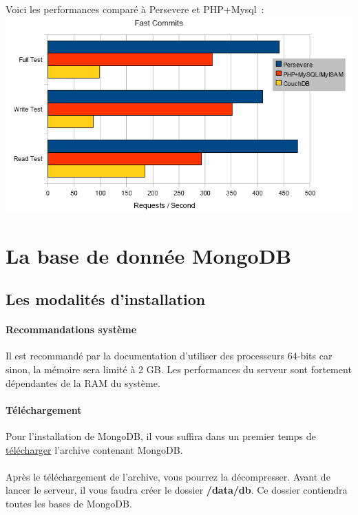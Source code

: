 \documentclass{article}
\begin{document}
  Voici les performances comparé à Persevere et PHP+Mysql :\\

  \includegraphics[scale=0.6]{couchBase/perf.png}\\
  
\newpage
\section{La base de donnée MongoDB}
\subsection{Les modalités d’installation}
  \paragraph{Recommandations système} 
    Il est recommandé par la documentation d'utiliser des processeurs 64-bits car sinon,
    la mémoire sera limité à 2 GB.
    Les performances du serveur sont fortement dépendantes de la RAM du système.
  \paragraph{Téléchargement} Pour l'installation de MongoDB, il vous suffira
  dans un premier temps de \href{https://www.mongodb.com/download-center#community}{télécharger} 
  l'archive contenant MongoDB.
  \paragraph{} Après le téléchargement de l'archive, vous pourrez la décompresser. Avant
  de lancer le serveur, il vous faudra créer le dossier \textbf{/data/db}. Ce dossier
  contiendra toutes les bases de MongoDB.
\end{document}
